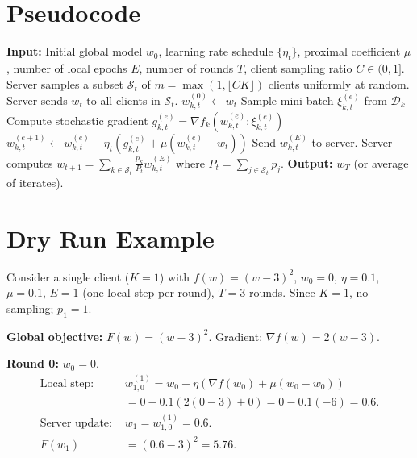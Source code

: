 \documentclass{article}
\begin{document}
\section*{Pseudocode}

\begin{algorithm}[H]
\caption{FedProx}
\begin{algorithmic}[1]
\STATE \textbf{Input:} Initial global model $w_0$, learning rate schedule $\{\eta_t\}$, proximal coefficient $\mu$, number of local epochs $E$, number of rounds $T$, client sampling ratio $C \in (0,1]$.
    \STATE Server samples a subset $\mathcal{S}_t$ of $m = \max(1, \lfloor C K \rfloor)$ clients uniformly at random.
    \STATE Server sends $w_t$ to all clients in $\mathcal{S}_t$.
        \STATE $w_{k,t}^{(0)} \leftarrow w_t$
            \STATE Sample mini-batch $\xi_{k,t}^{(e)}$ from $\mathcal{D}_k$
            \STATE Compute stochastic gradient $g_{k,t}^{(e)} = \nabla f_k(w_{k,t}^{(e)}; \xi_{k,t}^{(e)})$
            \STATE $w_{k,t}^{(e+1)} \leftarrow w_{k,t}^{(e)} - \eta_t \left( g_{k,t}^{(e)} + \mu (w_{k,t}^{(e)} - w_t) \right)$
        \ENDFOR
        \STATE Send $w_{k,t}^{(E)}$ to server.
    \ENDFOR
    \STATE Server computes $w_{t+1} = \sum_{k \in \mathcal{S}_t} \frac{p_k}{P_t} w_{k,t}^{(E)}$ where $P_t = \sum_{j \in \mathcal{S}_t} p_j$.
\ENDFOR
\STATE \textbf{Output:} $w_T$ (or average of iterates).
\end{algorithmic}
\end{algorithm}

\section*{Dry Run Example}

Consider a single client ($K=1$) with $f(w) = (w-3)^2$, $w_0 = 0$, $\eta = 0.1$, $\mu = 0.1$, $E=1$ (one local step per round), $T=3$ rounds. Since $K=1$, no sampling; $p_1=1$.

\textbf{Global objective:} $F(w) = (w-3)^2$. Gradient: $\nabla f(w) = 2(w-3)$.

\textbf{Round 0:} $w_0 = 0$.
\begin{align*}
    \text{Local step: } & w_{1,0}^{(1)} = w_0 - \eta \left( \nabla f(w_0) + \mu (w_0 - w_0) \right) \\
    &= 0 - 0.1 \left( 2(0-3) + 0 \right) = 0 - 0.1(-6) = 0.6. \\
    \text{Server update: } & w_1 = w_{1,0}^{(1)} = 0.6. \\
    F(w_1) &= (0.6-3)^2 = 5.76.
\end{align*}
\end{document}

